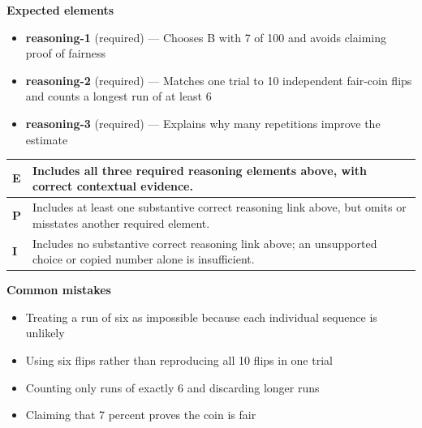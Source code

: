 \documentclass[11pt]{article}
\begin{document}

\textbf{Expected elements}
\begin{itemize}[leftmargin=1.5em,itemsep=2pt,topsep=2pt]
  \item \textbf{reasoning-1} (required) --- Chooses B with 7 of 100 and avoids claiming proof of fairness
  \item \textbf{reasoning-2} (required) --- Matches one trial to 10 independent fair-coin flips and counts a longest run of at least 6
  \item \textbf{reasoning-3} (required) --- Explains why many repetitions improve the estimate
\end{itemize}

{\small\renewcommand{\arraystretch}{1.25}
\noindent\begin{tabular}{|p{0.5in}|p{5.9in}|}
\hline
\textbf{E} & Includes all three required reasoning elements above, with correct contextual evidence. \\ \hline
\textbf{P} & Includes at least one substantive correct reasoning link above, but omits or misstates another required element. \\ \hline
\textbf{I} & Includes no substantive correct reasoning link above; an unsupported choice or copied number alone is insufficient. \\ \hline
\end{tabular}}

\textbf{Common mistakes}
\begin{itemize}[leftmargin=1.5em,itemsep=2pt,topsep=2pt]
  \item Treating a run of six as impossible because each individual sequence is unlikely
  \item Using six flips rather than reproducing all 10 flips in one trial
  \item Counting only runs of exactly 6 and discarding longer runs
  \item Claiming that 7 percent proves the coin is fair
\end{itemize}

\clearpage
{}
\end{document}
